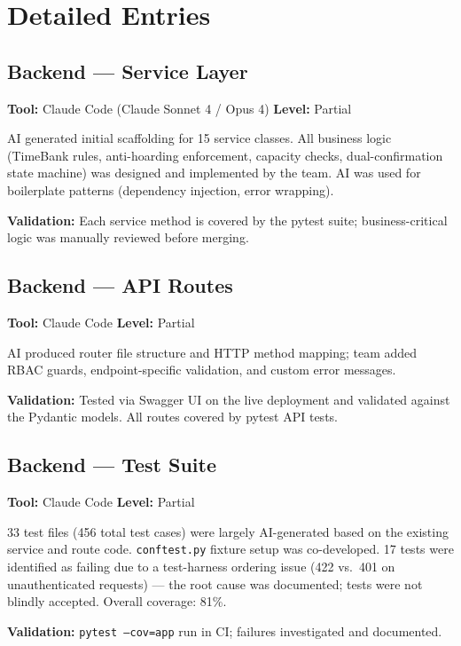 \documentclass[11pt,a4paper]{report}
\begin{document}
\section{Detailed Entries}

\subsection{Backend --- Service Layer}

\textbf{Tool:} Claude Code (Claude Sonnet 4 / Opus 4) \quad \textbf{Level:} Partial

AI generated initial scaffolding for 15 service classes. All business logic (TimeBank rules, anti-hoarding enforcement, capacity checks, dual-confirmation state machine) was designed and implemented by the team. AI was used for boilerplate patterns (dependency injection, error wrapping).

\textbf{Validation:} Each service method is covered by the pytest suite; business-critical logic was manually reviewed before merging.

\subsection{Backend --- API Routes}

\textbf{Tool:} Claude Code \quad \textbf{Level:} Partial

AI produced router file structure and HTTP method mapping; team added RBAC guards, endpoint-specific validation, and custom error messages.

\textbf{Validation:} Tested via Swagger UI on the live deployment and validated against the Pydantic models. All routes covered by pytest API tests.

\subsection{Backend --- Test Suite}

\textbf{Tool:} Claude Code \quad \textbf{Level:} Partial

33 test files (456 total test cases) were largely AI-generated based on the existing service and route code. \texttt{conftest.py} fixture setup was co-developed. 17 tests were identified as failing due to a test-harness ordering issue (422 vs.\ 401 on unauthenticated requests) — the root cause was documented; tests were not blindly accepted. Overall coverage: 81\%.

\textbf{Validation:} \texttt{pytest --cov=app} run in CI; failures investigated and documented.
\end{document}
